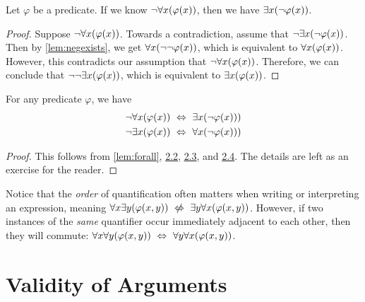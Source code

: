\begin{lemma}\label{lem:negforall}
    Let $\varphi$ be a predicate.
    If we know $\neg \forall x \pn*{\varphi(x)}$, then we have $\exists x \pn*{\neg \varphi(x)}$.
\end{lemma}
\begin{proof}
    Suppose $\neg \forall x \pn*{\varphi(x)}$.
    Towards a contradiction, assume that $\neg \exists x \pn*{\neg \varphi(x)}$.
    Then by \autoref{lem:negexists}, we get $\forall x \pn*{\neg \neg \varphi(x)}$,
    which is equivalent to $\forall x \pn*{\varphi(x)}$.
    However, this contradicts our assumption that $\neg \forall x \pn*{\varphi(x)}$. \contradiction
    Therefore, we can conclude that $\neg \neg \exists x \pn*{\varphi(x)}$,
    which is equivalent to $\exists x \pn*{\varphi(x)}$.
\end{proof}

\begin{theorem}
    For any predicate $\varphi$, we have
    \begin{align*}
        \neg \forall x \pn*{\varphi(x)} &\iff \exists x \pn*{\neg \varphi(x))}\\
        \neg \exists x \pn*{\varphi(x)} &\iff \forall x \pn*{\neg \varphi(x))}
    \end{align*}
\end{theorem}
\begin{proof}
    This follows from \autoref{lem:forall}, \hyperref[lem:negexists]{2.2}, \hyperref[lem:exists]{2.3},
    and \hyperref[lem:negforall]{2.4}.
    The details are left as an exercise for the reader.
\end{proof}

\begin{remark}
    Notice that the \emph{order} of quantification often matters when writing or interpreting an expression,
    meaning $\forall x \exists y \pn*{\varphi(x, y)} \niff \exists y \forall x \pn*{\varphi(x, y)}$.
    However, if two instances of the \emph{same} quantifier occur immediately adjacent to each other,
    then they will commute: $\forall x \forall y \pn*{\varphi(x, y)} \iff \forall y \forall x \pn*{\varphi(x, y)}$.
\end{remark}

\newpage

\section{Validity of Arguments}

